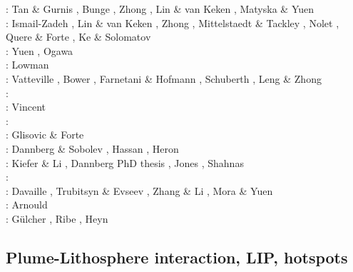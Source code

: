 \begin{scriptsize}
\twothousandfive: Tan \& Gurnis \cite{tagu05}, Bunge \cite{bung05}, Zhong \cite{zhon05}, 
                  Lin \& van Keken \cite{liva05}, Matyska \& Yuen \cite{mayu05}\\
\twothousandsix: Ismail-Zadeh \etal \cite{isst06}, Lin \& van Keken \cite{liva06a,liva06b}, 
                 Zhong \cite{zhon06}, Mittelstaedt \& Tackley \cite{mita06},
                 Nolet \etal \cite{nokm06}, Quere \& Forte \cite{qufo06}, Ke \& Solomatov \cite{keso06}\\
\twothousandseven: Yuen \etal \cite{yumh07}, Ogawa \cite{ogaw07}\\
\twothousandeight: Lowman \etal \cite{logg08} \\
\twothousandnine: Vatteville \etal \cite{vavl09}, Bower \etal \cite{bogj09},
                  Farnetani \& Hofmann \cite{faho09}, Schuberth \etal \cite{scbs09b},
                  Leng \& Zhong \cite{lezh09}\\
\twothousandeleven: \cite{toyu11}\cite{talz11}\cite{burk11}\cite{memm11}\cite{dalt11}\cite{tree11}\\
\twothousandtwelve: Vincent \etal{} \cite{viym12}\\
\twothousandthirteen: \cite{dagm13}\cite{madd13}\cite{ande13}\cite{vadv13}\\
\twothousandfourteen: Glisovic \& Forte \cite{glfo14} \\
\twothousandfifteen: Dannberg \& Sobolev \cite{daso15}, Hassan \etal \cite{hafg15}, 
                     Heron \etal \cite{hels15}\\
\twothousandsixteen: Kiefer \& Li \cite{kili16}, Dannberg PhD thesis \cite{dannbergphd}, 
                     Jones \etal \cite{jodc16}, Shahnas \etal \cite{shpy16}\\
\twothousandseventeen: \cite{moyu17}\cite{lizh17}\\
\twothousandeighteen: Davaille \etal \cite{dacc18}, Trubitsyn \& Evseev \cite{trev18}, 
                      Zhang \& Li \cite{zhli18}, Mora \& Yuen \cite{moyu18}\\
\twothousandnineteen: Arnould \etal \cite{argc19}\\
\twothousandtwenty: G{\"u}lcher \etal \cite{gugm20}, Ribe \etal \cite{rits20},
                    Heyn \etal \cite{hect20b}
\end{scriptsize}

\subsection{Plume-Lithosphere interaction, LIP, hotspots}

